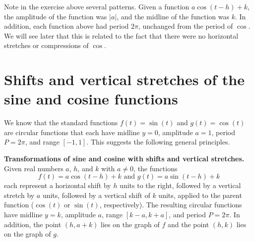 \documentclass{ximera}
\begin{document}
Note in the exercise above several patterns. Given a function $a\cos(t - h) + k$, the amplitude of the function was $|a|$, and the midline of the function was $k$. In addition, each function above had period $2\pi$, unchanged from the period of $\cos$. We will see later that this is related to the fact that there were no horizontal stretches or compressions of $\cos$.
%
%
%
\section{Shifts and vertical stretches of the sine and cosine functions}
We know that the standard functions \(f(t) = \sin(t)\) and \(g(t) = \cos(t)\) are circular functions that each have midline \(y = 0\), amplitude \(a = 1\), period \(P = 2\pi\), and range \([-1,1]\). This suggests the following general principles.%
\begin{callout}
\textbf{Transformations of sine and cosine with shifts and vertical stretches.}\\
Given real numbers \(a\), \(h\), and \(k\) with \(a \ne 0\), the functions%
\[
f(t) = a\cos(t-h)+k \text{ and } g(t) = a\sin(t-h) + k
\]
each represent a horizontal shift by \(h\) units to the right, followed by a vertical stretch by \(a\) units, followed by a vertical shift of \(k\) units, applied to the parent function (\(\cos(t)\) or \(\sin(t)\), respectively).  The resulting circular functions have midline \(y = k\), amplitude \(a\), range \([k-a,k+a]\), and period \(P = 2\pi\).  In addition, the point \((h,a+k)\) lies on the graph of \(f\) and the point \((h, k)\) lies on the graph of \(g\).%
\end{callout}
\end{document}
